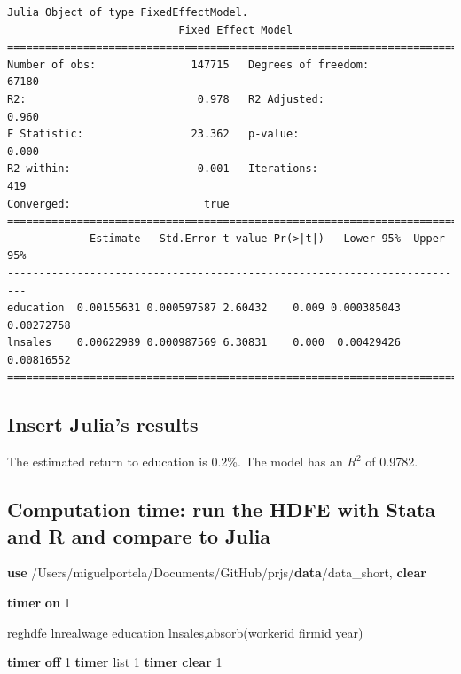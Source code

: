 \documentclass[
  12pt,
]{article}
\newenvironment{Shaded}{\begin{snugshade}}{\end{snugshade}}
\newcommand{\FunctionTok}[1]{\textcolor[rgb]{0.00,0.00,0.00}{#1}}
\newcommand{\KeywordTok}[1]{\textcolor[rgb]{0.13,0.29,0.53}{\textbf{#1}}}
\newcommand{\NormalTok}[1]{#1}
\newcommand{\OtherTok}[1]{\textcolor[rgb]{0.56,0.35,0.01}{#1}}
\begin{document}
\begin{verbatim}
Julia Object of type FixedEffectModel.
                           Fixed Effect Model                           
=========================================================================
Number of obs:               147715   Degrees of freedom:           67180
R2:                           0.978   R2 Adjusted:                  0.960
F Statistic:                 23.362   p-value:                      0.000
R2 within:                    0.001   Iterations:                     419
Converged:                     true   
=========================================================================
             Estimate   Std.Error t value Pr(>|t|)   Lower 95%  Upper 95%
-------------------------------------------------------------------------
education  0.00155631 0.000597587 2.60432    0.009 0.000385043 0.00272758
lnsales    0.00622989 0.000987569 6.30831    0.000  0.00429426 0.00816552
=========================================================================
\end{verbatim}

\hypertarget{insert-julias-results}{%
\subsection{Insert Julia's results}\label{insert-julias-results}}

\vspace{0.3cm}

The estimated return to education is 0.2\%. The model has an \(R^2\) of 0.9782.

\vspace{0.3cm}

\hypertarget{computation-time-run-the-hdfe-with-stata-and-r-and-compare-to-julia}{%
\subsection{Computation time: run the HDFE with Stata and R and compare to Julia}\label{computation-time-run-the-hdfe-with-stata-and-r-and-compare-to-julia}}

\begin{Shaded}
\begin{Highlighting}[]

\KeywordTok{use}\NormalTok{ /Users/miguelportela/Documents/GitHub/prjs/}\KeywordTok{data}\NormalTok{/data_short, }\KeywordTok{clear}

\KeywordTok{timer} \KeywordTok{on}\NormalTok{ 1}

\NormalTok{    reghdfe lnrealwage education lnsales,absorb(workerid firmid }\FunctionTok{year}\NormalTok{)}

\KeywordTok{timer} \KeywordTok{off}\NormalTok{ 1}
\KeywordTok{timer} \OtherTok{list}\NormalTok{ 1}
\KeywordTok{timer} \KeywordTok{clear}\NormalTok{ 1}
\end{Highlighting}
\end{Shaded}
\end{document}
